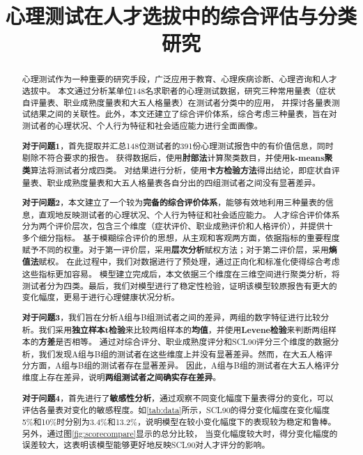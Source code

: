 \documentclass[withoutpreface,bwprint]{cumcmthesis} %
\title{心理测试在人才选拔中的综合评估与分类研究}
\begin{document}
 \maketitle
 \begin{abstract}
    心理测试作为一种重要的研究手段，广泛应用于教育、心理疾病诊断、心理咨询和人才选拔中。
    本文通过分析某单位148名求职者的心理测试数据，研究三种常用量表（症状自评量表、职业成熟度量表和大五人格量表）在测试者分类中的应用，
    并探讨各量表测试结果之间的关联性。此外，本文还建立了综合评价体系，综合考虑三种量表，旨在对测试者的心理状况、个人行为特征和社会适应能力进行全面画像。

    \textbf{对于问题1}，首先提取并汇总148位测试者的391份心理测试报告中的有价值信息，同时剔除不符合要求的报告。
    获得数据后，使用\textbf{肘部法}计算聚类数目，并使用\textbf{k-means聚类}算法将测试者分成四类。
    对结果进行分析，使用\textbf{卡方检验方法}得出结论，即症状自评量表、职业成熟度量表和大五人格量表各自分出的四组测试者之间没有显著差异。

    \textbf{对于问题2}，本文建立了一个较为\textbf{完备的综合评价体系}，能够有效地利用三种量表的信息，直观地反映测试者的心理状况、个人行为特征和社会适应能力。
    人才综合评价体系分为两个评价层次，包含三个维度（症状评价、职业成熟评价和人格评价），并提供十多个细分指标。
    基于模糊综合评价的思想，从主观和客观两方面，依据指标的重要程度赋予不同的权重。对于第一评价层，采用\textbf{层次分析}赋权方法；对于第二评价层，采用\textbf{熵值法}赋权。
    在此过程中，我们对数据进行了预处理，通过正向化和标准化使得综合考虑这些指标更加容易。
    模型建立完成后，本文依据三个维度在三维空间进行聚类分析，将测试者分为四类。最后，我们对模型进行了稳定性检验，证明该模型较原报告有更大的变化幅度，更易于进行心理健康状况分析。

    \textbf{对于问题3}，我们旨在分析A组与B组测试者之间的差异，两组的数字特征进行比较分析。我们采用\textbf{独立样本t检验}来比较两组样本的\textbf{均值}，并使用\textbf{Levene检验}来判断两组样本的\textbf{方差}是否相等。
    通过对综合评分、职业成熟度评分和SCL90评分三个维度的数据分析，我们发现A组与B组的测试者在这些维度上并没有显著差异。然而，在大五人格评分方面，A组与B组的测试者存在显著差异。
    因此，A组与B组的测试者在大五人格评分维度上存在差异，说明\textbf{两组测试者之间确实存在差异}。
    
    \textbf{对于问题4}，首先进行了\textbf{敏感性分析}，通过观察不同变化幅度下量表得分的变化，可以评估各量表对变化的敏感程度。如\cref{tab:data}所示，SCL90的得分变化幅度在变化幅度5\%和10\%时分别为3.4\%和13.2\%，说明模型在较小变化幅度下的表现较为稳定和鲁棒。
    另外，通过图\cref{fig:scorecompare}显示的总分比较， 当变化幅度较大时，得分变化幅度的误差较大，这表明该模型能够更好地反映SCL90对人才评分的影响。

\end{abstract}
\end{document}
